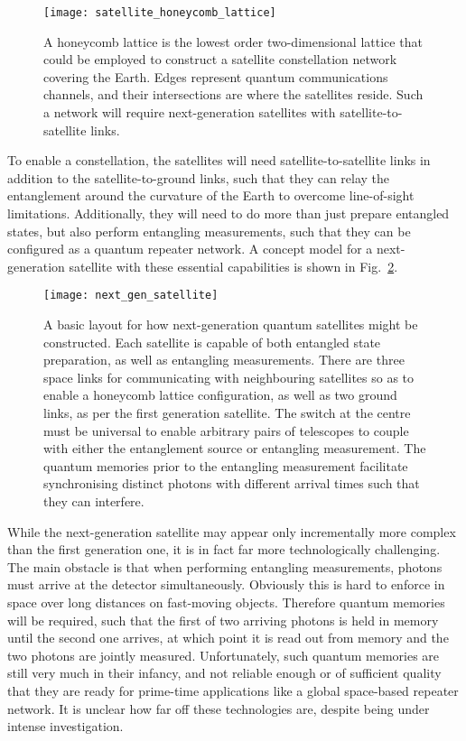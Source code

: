\begin{figure}[!htbp]
\texttt{[image: satellite\_honeycomb\_lattice]}
\caption{A honeycomb lattice is the lowest order two-dimensional lattice that could be employed to construct a satellite constellation network covering the Earth. Edges represent quantum communications channels, and their intersections are where the satellites reside. Such a network will require next-generation satellites with satellite-to-satellite links.}\label{fig:sat_honeycomb}	
\end{figure}

To enable a constellation, the satellites will need satellite-to-satellite links in addition to the satellite-to-ground links, such that they can relay the entanglement around the curvature of the Earth to overcome line-of-sight limitations. Additionally, they will need to do more than just prepare entangled states, but also perform entangling measurements, such that they can be configured as a quantum repeater network. A concept model for a next-generation satellite with these essential capabilities is shown in Fig.~\ref{fig:next_gen_sat}.

\begin{figure}[!htbp]
\texttt{[image: next\_gen\_satellite]}
\caption{A basic layout for how next-generation quantum satellites might be constructed. Each satellite is capable of both entangled state preparation, as well as entangling measurements. There are three space links for communicating with neighbouring satellites so as to enable a honeycomb lattice configuration, as well as two ground links, as per the first generation satellite. The switch at the centre must be universal to enable arbitrary pairs of telescopes to couple with either the entanglement source or entangling measurement. The quantum memories prior to the entangling measurement facilitate synchronising distinct photons with different arrival times such that they can interfere.}\label{fig:next_gen_sat}	
\end{figure}

While the next-generation satellite may appear only incrementally more complex than the first generation one, it is in fact far more technologically challenging. The main obstacle is that when performing entangling measurements, photons must arrive at the detector simultaneously. Obviously this is hard to enforce in space over long distances on fast-moving objects. Therefore quantum memories will be required, such that the first of two arriving photons is held in memory until the second one arrives, at which point it is read out from memory and the two photons are jointly measured. Unfortunately, such quantum memories are still very much in their infancy, and not reliable enough or of sufficient quality that they are ready for prime-time applications like a global space-based repeater network. It is unclear how far off these technologies are, despite being under intense investigation.

